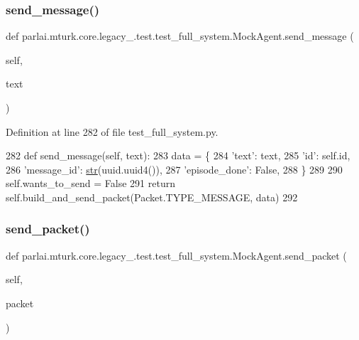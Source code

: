 \subsubsection{\texorpdfstring{send\+\_\+message()}{send\_message()}}
{\footnotesize\ttfamily def parlai.\+mturk.\+core.\+legacy\+\_.\+test.\+test\+\_\+full\+\_\+system.\+Mock\+Agent.\+send\+\_\+message (\begin{DoxyParamCaption}\item[{}]{self,  }\item[{}]{text }\end{DoxyParamCaption})}



Definition at line 282 of file test\+\_\+full\+\_\+system.\+py.


\begin{DoxyCode}
282     \textcolor{keyword}{def }send\_message(self, text):
283         data = \{
284             \textcolor{stringliteral}{'text'}: text,
285             \textcolor{stringliteral}{'id'}: self.id,
286             \textcolor{stringliteral}{'message\_id'}: \hyperlink{namespacegenerate__task__READMEs_a5b88452ffb87b78c8c85ececebafc09f}{str}(uuid.uuid4()),
287             \textcolor{stringliteral}{'episode\_done'}: \textcolor{keyword}{False},
288         \}
289 
290         self.wants\_to\_send = \textcolor{keyword}{False}
291         \textcolor{keywordflow}{return} self.build\_and\_send\_packet(Packet.TYPE\_MESSAGE, data)
292 
\end{DoxyCode}
\mbox{\label{classparlai_1_1mturk_1_1core_1_1legacy__2018_1_1test_1_1test__full__system_1_1MockAgent_a0774b6b93a6ceec37e5d1d910c222f84}} 
\subsubsection{\texorpdfstring{send\+\_\+packet()}{send\_packet()}}
{\footnotesize\ttfamily def parlai.\+mturk.\+core.\+legacy\+\_.\+test.\+test\+\_\+full\+\_\+system.\+Mock\+Agent.\+send\+\_\+packet (\begin{DoxyParamCaption}\item[{}]{self,  }\item[{}]{packet }\end{DoxyParamCaption})}



